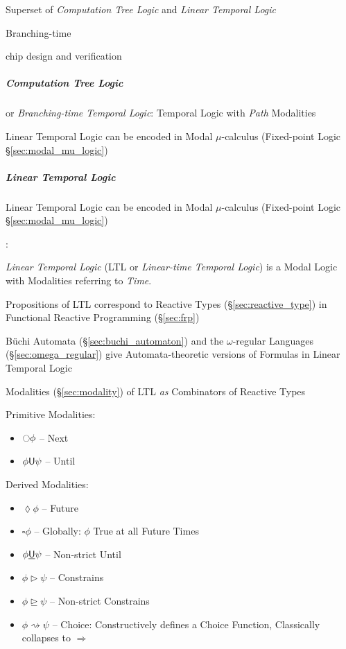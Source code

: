 Superset of \emph{Computation Tree Logic} and \emph{Linear Temporal Logic}

Branching-time

chip design and verification



\subparagraph{Computation Tree Logic}\label{sec:ctl}\hfill

or \emph{Branching-time Temporal Logic}: Temporal Logic with \emph{Path}
Modalities

\fist Linear Temporal Logic can be encoded in Modal $\mu$-calculus (Fixed-point
Logic \S\ref{sec:modal_mu_logic})



\subparagraph{Linear Temporal Logic}\label{sec:linear_temporal}\hfill

\fist Linear Temporal Logic can be encoded in Modal $\mu$-calculus (Fixed-point
Logic \S\ref{sec:modal_mu_logic})

\cite{jeffrey12}:

\emph{Linear Temporal Logic} (LTL or \emph{Linear-time Temporal Logic}) is a
Modal Logic with Modalities referring to \emph{Time}.

Propositions of LTL correspond to Reactive Types (\S\ref{sec:reactive_type}) in
Functional Reactive Programming (\S\ref{sec:frp})

B\"uchi Automata (\S\ref{sec:buchi_automaton}) and the $\omega$-regular
Languages (\S\ref{sec:omega_regular}) give Automata-theoretic versions of
Formulas in Linear Temporal Logic

Modalities (\S\ref{sec:modality}) of LTL \emph{as} Combinators of Reactive Types

Primitive Modalities:
\begin{itemize}
  \item $\ocircle \phi$ -- Next
  \item $\phi \mathsf{U} \psi$ -- Until
\end{itemize}

Derived Modalities:
\begin{itemize}
  \item $\lozenge \phi$ -- Future
  \item $\square \phi$ -- Globally: $\phi$ True at all Future Times
  \item $\phi \underline{\mathsf{U}} \psi$ -- Non-strict Until
  \item $\phi \rhd \psi$ -- Constrains
  \item $\phi \unrhd \psi$ -- Non-strict Constrains
  \item $\phi \rightsquigarrow \psi$ -- Choice: Constructively defines
    a Choice Function, Classically collapses to $\Rightarrow$
\end{itemize}

